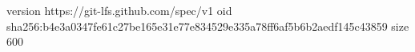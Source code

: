 version https://git-lfs.github.com/spec/v1
oid sha256:b4e3a0347fe61c27be165e31e77e834529e335a78ff6af5b6b2aedf145c43859
size 600
